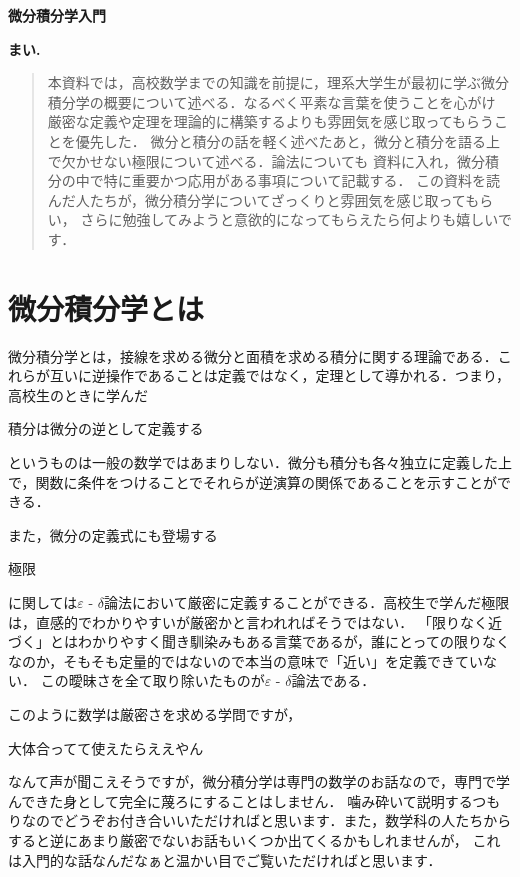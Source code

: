 \documentclass[a4paper,12pt,autodetect-engine,dvipdfmx]{jsarticle}
\theoremstyle{definition}
\begin{document}
\begin{center}
{\LARGE{ \bf{微分積分学入門} }}

\vspace{10mm}

{\Large{ \bf{まい.}}}
\end{center}

\bigskip
\begin{abstract}
本資料では，高校数学までの知識を前提に，理系大学生が最初に学ぶ微分積分学の概要について述べる．なるべく平素な言葉を使うことを心がけ
厳密な定義や定理を理論的に構築するよりも雰囲気を感じ取ってもらうことを優先した．
微分と積分の話を軽く述べたあと，微分と積分を語る上で欠かせない極限について述べる．論法についても
資料に入れ，微分積分の中で特に重要かつ応用がある事項について記載する．
この資料を読んだ人たちが，微分積分学についてざっくりと雰囲気を感じ取ってもらい，
さらに勉強してみようと意欲的になってもらえたら何よりも嬉しいです．

\end{abstract}
\newpage
\tableofcontents


\newpage
\section{微分積分学とは}
微分積分学とは，接線を求める微分と面積を求める積分に関する理論である．これらが互いに逆操作であることは定義ではなく，定理として導かれる．つまり，
高校生のときに学んだ
\begin{center}
    積分は微分の逆として定義する
\end{center}
というものは一般の数学ではあまりしない．微分も積分も各々独立に定義した上で，関数に条件をつけることでそれらが逆演算の関係であることを示すことができる．

また，微分の定義式にも登場する
\begin{center}
    極限
\end{center}
に関しては$\varepsilon$ - $\delta$論法において厳密に定義することができる．高校生で学んだ極限は，直感的でわかりやすいが厳密かと言われればそうではない．
「限りなく近づく」とはわかりやすく聞き馴染みもある言葉であるが，誰にとっての限りなくなのか，そもそも定量的ではないので本当の意味で「近い」を定義できていない．
この曖昧さを全て取り除いたものが$\varepsilon$ - $\delta$論法である．

このように数学は厳密さを求める学問ですが，
\begin{center}
    大体合ってて使えたらええやん
\end{center}
なんて声が聞こえそうですが，微分積分学は専門の数学のお話なので，専門で学んできた身として完全に蔑ろにすることはしません．
噛み砕いて説明するつもりなのでどうぞお付き合いいただければと思います．また，数学科の人たちからすると逆にあまり厳密でないお話もいくつか出てくるかもしれませんが，
これは入門的な話なんだなぁと温かい目でご覧いただければと思います．
\end{document}
